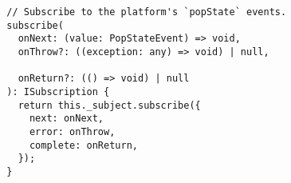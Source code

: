 \begin{verbatim}
  // Subscribe to the platform's `popState` events.
  subscribe(
    onNext: (value: PopStateEvent) => void,
    onThrow?: ((exception: any) => void) | null,

    onReturn?: (() => void) | null
  ): ISubscription {
    return this._subject.subscribe({
      next: onNext,
      error: onThrow,
      complete: onReturn,
    });
  }
\end{verbatim}
